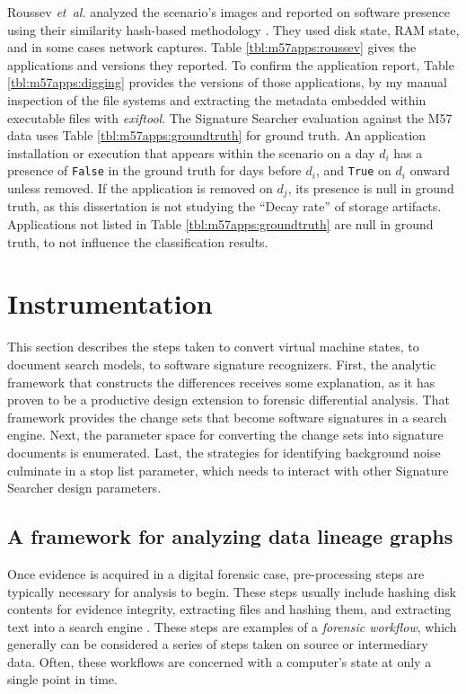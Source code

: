 \documentclass[11pt]{ucthesis}
\theoremstyle{plain}
\theoremstyle{definition}
\newcommand{\etal}{\emph{et~al.}\xspace}
\newcommand{\exiftool}{\emph{exiftool}\xspace}
\begin{document}
Roussev \etal analyzed the scenario's images and reported on software presence using their similarity hash-based methodology \cite{roussev:dfrws12}.  They used disk state, RAM state, and in some cases network captures.  Table \ref{tbl:m57apps:roussev} gives the applications and versions they reported.  To confirm the application report, Table \ref{tbl:m57apps:digging} provides the versions of those applications, by my manual inspection of the file systems and extracting the metadata embedded within executable files with \exiftool \cite{harvey:exiftool}.  The Signature Searcher evaluation against the M57 data uses Table \ref{tbl:m57apps:groundtruth} for ground truth.  An application installation or execution that appears within the scenario on a day $d_i$ has a presence of \texttt{False} in the ground truth for days before $d_i$, and \texttt{True} on $d_i$ onward unless removed.  If the application is removed on $d_j$, its presence is null in ground truth, as this dissertation is not studying the ``Decay rate'' of storage artifacts.  Applications not listed in Table \ref{tbl:m57apps:groundtruth} are null in ground truth, to not influence the classification results.


\section{Instrumentation}
\label{sec:instrumentation}

This section describes the steps taken to convert virtual machine states, to document search models, to software signature recognizers.  First, the analytic framework that constructs the differences receives some explanation, as it has proven to be a productive design extension to forensic differential analysis.  That framework provides the change sets that become software signatures in a search engine.  Next, the parameter space for converting the change sets into signature documents is enumerated.  Last, the strategies for identifying background noise culminate in a stop list parameter, which needs to interact with other Signature Searcher design parameters.


\subsection{A framework for analyzing data lineage graphs}
\label{chapter:workflow}

Once evidence is acquired in a digital forensic case, pre-processing steps are typically necessary for analysis to begin.  These steps usually include hashing disk contents for evidence integrity, extracting files and hashing them, and extracting text into a search engine \cite{roussev:ifip12,garfinkel:computersandsecurity13}.  These steps are examples of a \emph{forensic workflow}, which generally can be considered a series of steps taken on source or intermediary data.  Often, these workflows are concerned with a computer's state at only a single point in time.
\end{document}
